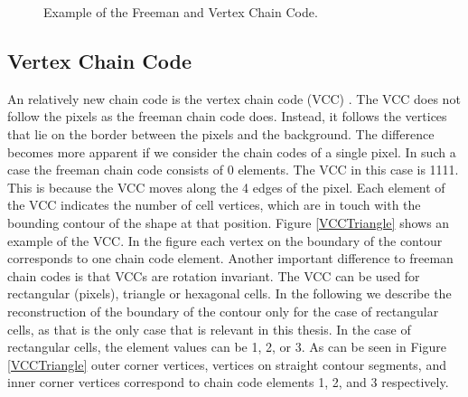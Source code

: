 \documentclass[thesis.tex]{subfiles}
\begin{document}
\begin{figure}
\centering
\begin{minipage}{\textwidth}
\end{minipage}
\caption{Example of the Freeman and Vertex Chain Code.}
 \label{fig:chainCodeExamples}
\end{figure}

\subsection{Vertex Chain Code}
\label{section:vertex_chain_code}
An relatively new chain code is the vertex chain code (VCC) \cite{vertex_chain_code}. The VCC does not follow the pixels as the freeman chain code does. Instead, it follows the vertices that lie on the border between the pixels and the background. The difference becomes more apparent if we consider the chain codes of a single pixel. In such a case the freeman chain code consists of 0 elements. The VCC in this case is 1111. This is because the VCC moves along the 4 edges of the pixel. Each element of the VCC indicates the number of cell vertices, which are in touch with the bounding contour of the shape at that position. Figure \ref{VCCTriangle} shows an example of the VCC. In the figure each vertex on the boundary of the contour corresponds to one chain code element. Another important difference to freeman chain codes is that VCCs are rotation invariant. The VCC can be used for rectangular (pixels), triangle or hexagonal cells. In the following we describe the reconstruction of the boundary of the contour only for the case of rectangular cells, as that is the only case that is relevant in this thesis. In the case of rectangular cells, the element values can be 1, 2, or 3. As can be seen in Figure \ref{VCCTriangle} outer corner vertices, vertices on straight contour segments, and inner corner vertices correspond to chain code elements 1, 2, and 3 respectively. 
\end{document}
